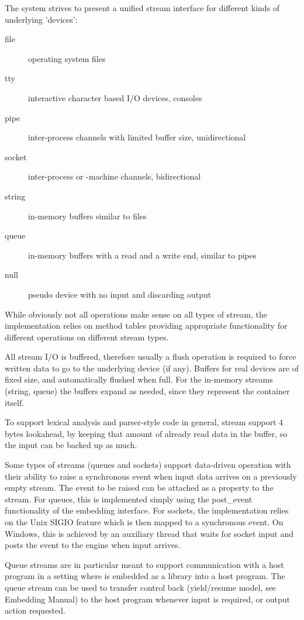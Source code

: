 The system strives to present a unified stream interface for different
kinds of underlying 'devices':
\begin{description}
\item[file] operating system files
\item[tty] interactive character based I/O devices, consoles
\item[pipe] inter-process channels with limited buffer size, unidirectional
\item[socket] inter-process or -machine channels, bidirectional
\item[string] in-memory buffers similar to files
\item[queue] in-memory buffers with a read and a write end, similar to pipes
\item[null] pseudo device with no input and discarding output
\end{description}
While obviously not all operations make sense on all types of stream,
the implementation relies on method tables providing appropriate functionality
for different operations on different stream types.

All stream I/O is buffered, therefore usually a flush operation is required
to force written data to go to the underlying device (if any).
Buffers for real devices are of fixed size, and automatically flushed
when full. For the in-memory streams (string, queue) the buffers expand
as needed, since they represent the container itself.

To support lexical analysis and parser-style code in general, stream
support 4 bytes lookahead, by keeping that amount of already read data
in the buffer, so the input can be backed up as much.

Some types of streams (queues and sockets)
support data-driven operation with their ability to raise a synchronous
event when input data arrives on a previously empty stream. The event
to be raised can be attached as a property to the stream.
For queues, this is implemented simply using the post_event functionality
of the embedding interface.  For sockets, the implementation relies
on the Unix SIGIO feature which is then mapped to a synchronous event.
On Windows, this is achieved by an auxiliary thread that waits for socket
input and posts the event to the {\eclipse} engine when input arrives.

Queue streams are in particular meant to support communication with a
host program in a setting where {\eclipse} is embedded as a library
into a host program. The queue stream can be used to transfer control
back (yield/resume model, see Embedding Manual) to the host program
whenever input is required, or output action requested.


